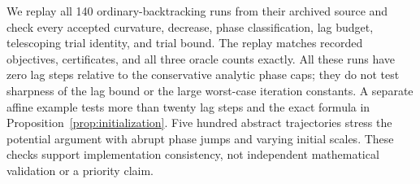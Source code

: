 We replay all 140 ordinary-backtracking runs from their archived source
and check every accepted curvature, decrease, phase classification,
lag budget, telescoping trial identity, and trial bound. The replay
matches recorded objectives, certificates, and all three oracle counts
exactly. All these runs have zero lag steps relative to the conservative
analytic phase caps; they do not test sharpness of the lag bound or the
large worst-case iteration constants. A separate affine example tests
more than twenty lag steps and the exact formula in
Proposition~\ref{prop:initialization}. Five hundred abstract trajectories
stress the potential argument with abrupt phase jumps and varying
initial scales. These checks support implementation consistency, not
independent mathematical validation or a priority claim.


